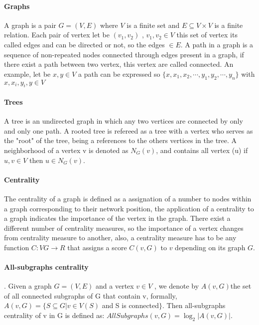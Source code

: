 

\paragraph{Graphs} A graph is a pair $G = (V, E)$ where $V$ is a finite set and $E \subseteq V\times V$ is a finite relation. Each pair of vertex let be $(v_{1},v_{2})$ , $v_{1},v_{2} \in V$ this set of vertex its called edges and can be directed or not, so the edges $\in E$. A path in a graph is a sequence of non-repeated nodes connected through edges present in a graph, if there exist a path between two vertex, this vertex are called connected. An example, let be $x,y \in V$ a path can be expressed so $\{x,x_{1},x_{2},\cdots,y_{1},y_{2},\cdots,y_{n} \}$ with $x,x_{i},y_{i},y \in V$

\paragraph{Trees} A tree is an undirected graph in which any two vertices are connected by only and only one path. A rooted tree is refereed as a tree with a vertex who serves as the "root" of the tree, being a references to the others  vertices in the tree. A neighborhood of a vertex v is denoted as $N_{G}(v)$, and contains all vertex (u) if ${u,v} \in V$ then $u \in N_{G}(v)$.

\paragraph{Centrality} The centrality of a graph is defined as a assignation of a number to nodes within a graph corresponding to their network position, the application of a centrality to a graph indicates the importance of the vertex in the graph. There exist a different number of centrality measures, so the importance of a vertex changes from centrality measure to another, also, a centrality measure has to be any function $C : VG \rightarrow R$ that assigns a score $C(v, G)$ to $v$ depending on its graph $G$. 

\paragraph{All-subgraphs centrality} . Given a graph $G = (V, E)$ and a vertex $v \in V$ , we denote by
$A(v, G) $the set of all connected subgraphs of G that contain v, formally, $A(v, G) = \{S \subseteq G | v \in V (S)$ and S is connected$\}$. Then all-subgraphs centrality of v in G is defined
as: $AllSubgraphs(v, G) = \log_{2}{|A(v, G)|}$.


